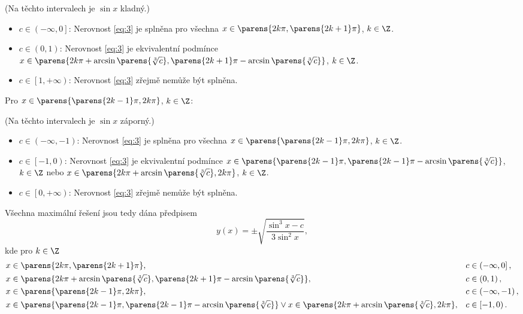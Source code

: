 \documentclass[answers]{exam}
\begin{document}
\begin{questions}
\begin{solution}
  	(Na těchto intervalech je $\sin x$ kladný.)
  	\begin{itemize}
  		\item $c \in \left( -\infty, 0 \right]$: Nerovnost \eqref{eq:3} je splněna pro všechna $x \in \parens{2k\pi, \parens{2k+1}\pi}$, $k \in \Z$.
  		\item $c \in \left( 0, 1 \right)$: Nerovnost \eqref{eq:3} je ekvivalentní podmínce $x \in \parens{2k\pi + \arcsin\parens{\sqrt[3]{c}}, \parens{2k+1}\pi - \arcsin\parens{\sqrt[3]{c}}}$, $k \in \Z$.
  		\item $c \in \left[ 1, +\infty \right)$: Nerovnost \eqref{eq:3} zřejmě nemůže být splněna.
  	\end{itemize}
  	
  	Pro $x \in \parens{\parens{2k-1}\pi, 2k\pi}$, $k \in \Z$:
  	
  	(Na těchto intervalech je $\sin x$ záporný.)
  	\begin{itemize}
  		\item $c \in \left( -\infty, -1 \right)$: Nerovnost \eqref{eq:3} je splněna pro všechna $x \in \parens{\parens{2k-1}\pi, 2k\pi}$, $k \in \Z$.
  		\item $c \in \left[ -1, 0 \right)$: Nerovnost \eqref{eq:3} je ekvivalentní podmínce $x \in \parens{\parens{2k-1}\pi, \parens{2k-1}\pi - \arcsin\parens{\sqrt[3]{c}}}$, $k \in \Z$ nebo $x \in \parens{2k\pi + \arcsin\parens{\sqrt[3]{c}}, 2k\pi}$, $k \in \Z$.
  		\item $c \in \left[ 0, +\infty \right)$: Nerovnost \eqref{eq:3} zřejmě nemůže být splněna.
  	\end{itemize}
  	
  	Všechna maximální řešení jsou tedy dána předpisem
  	\begin{equation*}
  		y(x)
  		=
  		\pm \sqrt{\frac{\sin^3 x - c}{3 \sin^2 x}},
  	\end{equation*}
  	kde pro $k \in \Z$
  	\begin{align*}
  		x &\in \parens{2k\pi, \parens{2k+1}\pi}, &&c \in \left( -\infty, 0 \right],
  		\\
  		x &\in \parens{2k\pi + \arcsin\parens{\sqrt[3]{c}}, \parens{2k+1}\pi - \arcsin\parens{\sqrt[3]{c}}}, &&c \in \left( 0, 1 \right),
  		\\
  		x &\in \parens{\parens{2k-1}\pi, 2k\pi}, &&c \in \left( -\infty, -1 \right),
  		\\
  		x &\in \parens{\parens{2k-1}\pi, \parens{2k-1}\pi - \arcsin\parens{\sqrt[3]{c}}} \lor x \in \parens{2k\pi + \arcsin\parens{\sqrt[3]{c}}, 2k\pi}, &&c \in \left[ -1, 0 \right).
  	\end{align*}
  \end{solution}
\end{questions}
\end{document}

